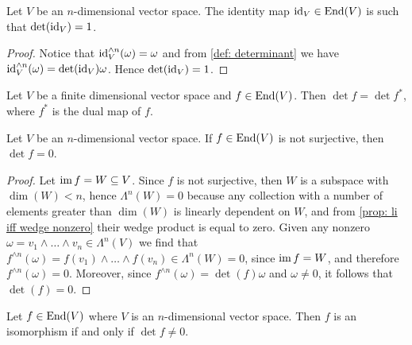 \begin{proposition}\label{prop: id det}
  Let \(V\) be an \(n\)-dimensional vector space. The identity map \(\operatorname{id}_V \in
  \operatorname{End}(V)\) is such that \(\det(\operatorname{id}_V) = 1\).
\end{proposition}

\begin{proof}
  Notice that \(\operatorname{id}_V^{\wedge n}(\omega) = \omega\) and from \cref{def:
  determinant} we have \(\operatorname{id}_V^{\wedge n}(\omega) = \det(\operatorname{id}_V) \omega\). Hence
  \(\det(\operatorname{id}_V) = 1\).
\end{proof}

\begin{proposition}
  Let \(V\) be a finite dimensional vector space and \(f \in \operatorname{End}(V)\). Then
  \(\det f = \det f^*\), where \(f^*\) is the dual map of \(f\).
\end{proposition}


\begin{lemma}\label{lem: not surjective 0 det}
  Let \(V\) be an \(n\)-dimensional vector space. If \(f \in \operatorname{End}(V)\) is not
  surjective, then \(\det f = 0\).
\end{lemma}

\begin{proof}
  Let \(\operatorname{im} f = W \subseteq V\). Since \(f\) is not surjective, then \(W\) is a
  subspace with \(\dim(W) < n\), hence \(\Lambda^n(W) = 0\) because any
  collection with a number of elements greater than \(\dim(W)\) is linearly
  dependent on \(W\), and from \cref{prop: li iff wedge nonzero} their wedge
  product is equal to zero. Given any nonzero \(\omega = v_1 \wedge \dots \wedge
  v_n \in \Lambda^n(V)\) we find that \(f^{\wedge n}(\omega) = f(v_1) \wedge
  \dots \wedge f(v_n) \in \Lambda^n(W) = 0\), since \(\operatorname{im} f = W\), and therefore
  \(f^{\wedge n}(\omega) = 0\). Moreover, since \(f^{\wedge n}(\omega) = \det(f)
  \omega\) and \(\omega \neq 0\), it follows that \(\det(f) = 0\).
\end{proof}

\begin{proposition}
  \label{prop: iso det}
  Let \(f \in \operatorname{End}(V)\) where \(V\) is an \(n\)-dimensional vector space. Then
  \(f\) is an isomorphism if and only if \(\det f \neq 0\).
\end{proposition}

